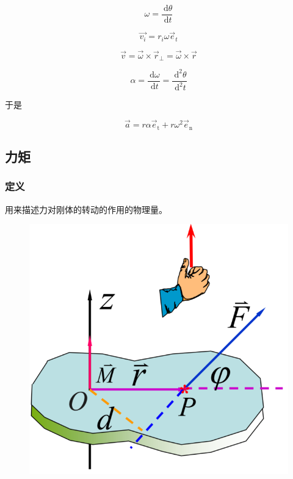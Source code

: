 \documentclass[12pt, a4paper]{article}
\numberwithin{equation}{section}
\newcommand{\rmd}{\mathrm{~d}}
\newcommand{\deriv}[2]{\frac{\rmd #1}{\rmd #2}}
\begin{document}
    \[
        \omega = \deriv{\theta}{t}
    \]

    \[
        \overrightarrow{v_i} = r_i \omega \overrightarrow{e}_t
    \]

    $$
        \overrightarrow{v}=\overrightarrow{\omega} \times \overrightarrow{r}_{\perp}=
        \overrightarrow{\omega} \times \overrightarrow{r}
    $$

    $$
        \alpha=\deriv{\omega}{t}=\frac{\rmd^2 \theta}{\rmd^2 t}
    $$

    于是

    \begin{equation}
        \overrightarrow{a}=r \alpha \overrightarrow{e}_{\mathrm{t}}+r \omega^2 \overrightarrow{e}_{\mathrm{n}}
    \end{equation}

\subsection{力矩}

\subsubsection{定义}

    用来描述力对刚体的转动的作用的物理量。

    \begin{figure}
        \centering
        \includegraphics[scale=0.2]{"Chapter 04 images/pic3.png"}
        \label{pic4-3}
    \end{figure}
\end{document}
